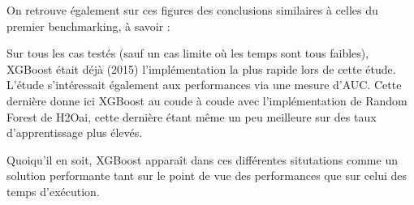 On retrouve également sur ces figures des conclusions similaires à celles du premier benchmarking, à savoir :
\begin{itemize}
	Sur tous les cas testés (sauf un cas limite où les temps sont tous faibles), XGBoost était déjà (2015) l'implémentation la plus rapide lors de cette étude.
	L'étude s'intéressait également aux performances via une mesure d'AUC. Cette dernière donne ici XGBoost au coude à coude avec l'implémentation de Random Forest de H2Oai, cette dernière étant même un peu meilleure sur des taux d'apprentissage plus élevés.
\end{itemize}
Quoiqu'il en soit, XGBoost apparaît dans ces différentes situtations comme un solution performante tant sur le point de vue des performances que sur celui des temps d'exécution.
